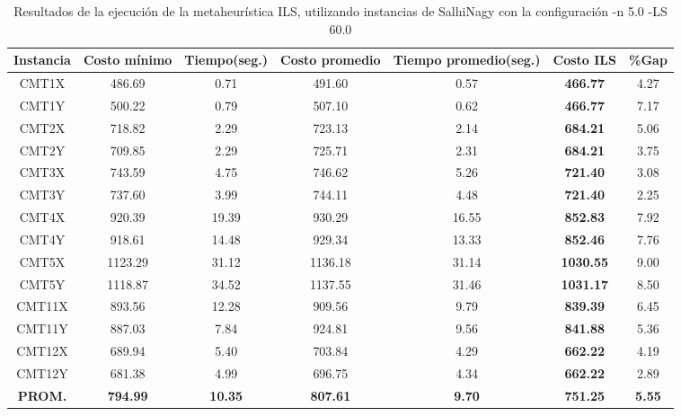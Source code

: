 \begin{table}[ht]
\caption{Resultados de la ejecución de la metaheurística ILS, utilizando instancias de SalhiNagy con la configuración -n 5.0 -LS 60.0}
\centering
\small
\begin{tabular}{c c c c c c c}
\hline\hline
Instancia & Costo mínimo & Tiempo(seg.) & Costo promedio & Tiempo promedio(seg.) & Costo ILS & \%Gap \\ [0.5ex]
\hline
CMT1X & 486.69 & 0.71 & 
491.60 & 0.57 & \bf{466.77} & 
4.27\\CMT1Y & 500.22 & 0.79 & 
507.10 & 0.62 & \bf{466.77} & 
7.17\\CMT2X & 718.82 & 2.29 & 
723.13 & 2.14 & \bf{684.21} & 
5.06\\CMT2Y & 709.85 & 2.29 & 
725.71 & 2.31 & \bf{684.21} & 
3.75\\CMT3X & 743.59 & 4.75 & 
746.62 & 5.26 & \bf{721.40} & 
3.08\\CMT3Y & 737.60 & 3.99 & 
744.11 & 4.48 & \bf{721.40} & 
2.25\\CMT4X & 920.39 & 19.39 & 
930.29 & 16.55 & \bf{852.83} & 
7.92\\CMT4Y & 918.61 & 14.48 & 
929.34 & 13.33 & \bf{852.46} & 
7.76\\CMT5X & 1123.29 & 31.12 & 
1136.18 & 31.14 & \bf{1030.55} & 
9.00\\CMT5Y & 1118.87 & 34.52 & 
1137.55 & 31.46 & \bf{1031.17} & 
8.50\\CMT11X & 893.56 & 12.28 & 
909.56 & 9.79 & \bf{839.39} & 
6.45\\CMT11Y & 887.03 & 7.84 & 
924.81 & 9.56 & \bf{841.88} & 
5.36\\CMT12X & 689.94 & 5.40 & 
703.84 & 4.29 & \bf{662.22} & 
4.19\\CMT12Y & 681.38 & 4.99 & 
696.75 & 4.34 & \bf{662.22} & 
2.89\\\bf{PROM.} & 
\bf{794.99} & \bf{10.35} & \bf{807.61} & \bf{9.70} & \bf{751.25} & \bf{5.55}\\[1ex]\hline
\end{tabular}
\label{table:nonlin}
\end{table} \clearpage
